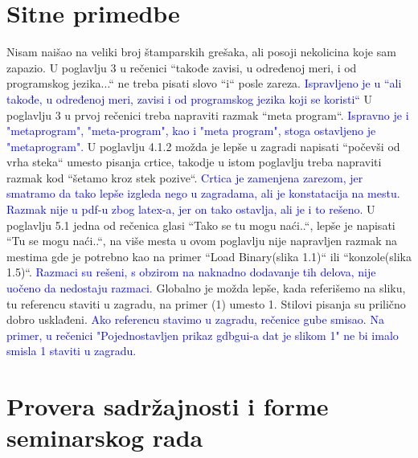 \documentclass[a4paper]{report}
\newcommand{\odgovor}[1]{\textcolor{blue}{#1}}
\begin{document}
\section{Sitne primedbe}
Nisam naišao na veliki broj štamparskih grešaka, ali posoji nekolicina koje sam zapazio. U poglavlju 3 u rečenici ``takođe zavisi, u određenoj meri, i od programskog jezika...`` ne treba pisati slovo ``i`` posle zareza. 
\odgovor{Ispravljeno je u ``ali takođe, u određenoj meri, zavisi i od programskog jezika koji se koristi``}
U poglavlju 3 u prvoj rečenici treba napraviti razmak ``meta program``.
\odgovor{Ispravno je i "metaprogram", "meta-program", kao i "meta program", stoga ostavljeno je "metaprogram".} 
U poglavlju 4.1.2 možda je lepše u zagradi napisati ``počevši od vrha steka`` umesto pisanja crtice, takodje u istom poglavlju treba napraviti razmak kod ``šetamo kroz stek pozive``.  
\odgovor{Crtica je zamenjena zarezom, jer smatramo da tako lepše izgleda nego u zagradama, ali je konstatacija na mestu. Razmak nije u pdf-u zbog latex-a, jer on tako ostavlja, ali je i to rešeno.}
U poglavlju 5.1 jedna od rečenica glasi ``Tako se tu mogu naći..``, lepše je napisati ``Tu se mogu naći..``, na više mesta u ovom poglavlju nije napravljen razmak 
na mestima gde je potrebno kao na primer ``Load Binary(slika 1.1)`` ili ``konzole(slika 1.5)``.
\odgovor{Razmaci su rešeni, s obzirom na naknadno dodavanje tih delova, nije uočeno da nedostaju razmaci.}
Globalno je možda lepše, kada referišemo na sliku, tu referencu staviti u zagradu, na primer (1) umesto 1. Stilovi pisanja su prilično dobro usklađeni.
\odgovor{Ako referencu stavimo u zagradu, rečenice gube smisao. Na primer, u rečenici "Pojednostavljen prikaz gdbgui-a dat je slikom 1" ne bi imalo smisla 1 staviti u zagradu.}

\section{Provera sadržajnosti i forme seminarskog rada}
\end{document}
